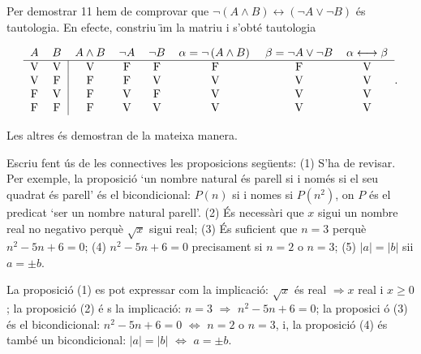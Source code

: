 Per demostrar 11 hem de comprovar que $\lnot(A\wedge B)\longleftrightarrow
\left( \lnot A\vee\lnot B\right) $ \'{e}s tautologia. En efecte, constriu%
\"{\i}m la matriu i s'obt\'{e} tautologia

\begin{equation*}
\begin{tabular}{llllllll}
$A$ & $B$ & $A\wedge B$ & $\lnot A$ & $\lnot B$ & $\alpha=\lnot\left(
A\wedge B\right) \,$ & $\beta=\lnot A\vee\lnot B$ & $\alpha%
\longleftrightarrow\beta $ \\ \hline
\multicolumn{1}{c}{V} & \multicolumn{1}{c|}{V} & \multicolumn{1}{c}{V} &
\multicolumn{1}{c}{F} & \multicolumn{1}{c}{F} & \multicolumn{1}{c}{F} &
\multicolumn{1}{c}{F} & \multicolumn{1}{c}{V} \\
\multicolumn{1}{c}{V} & \multicolumn{1}{c|}{F} & \multicolumn{1}{c}{F} &
\multicolumn{1}{c}{F} & \multicolumn{1}{c}{V} & \multicolumn{1}{c}{V} &
\multicolumn{1}{c}{V} & \multicolumn{1}{c}{V} \\
\multicolumn{1}{c}{F} & \multicolumn{1}{c|}{V} & \multicolumn{1}{c}{F} &
\multicolumn{1}{c}{V} & \multicolumn{1}{c}{F} & \multicolumn{1}{c}{V} &
\multicolumn{1}{c}{V} & \multicolumn{1}{c}{V} \\
\multicolumn{1}{c}{F} & \multicolumn{1}{c|}{F} & \multicolumn{1}{c}{F} &
\multicolumn{1}{c}{V} & \multicolumn{1}{c}{V} & \multicolumn{1}{c}{V} &
\multicolumn{1}{c}{V} & \multicolumn{1}{c}{V}%
\end{tabular}
.
\end{equation*}

Les altres \'{e}s demostran de la mateixa manera.

\begin{exemple}
Escriu fent \'{u}s de les connectives les proposicions seg\"{u}ents: (1)
S'ha de revisar. Per exemple, la proposici\'{o} `un nombre natural \'{e}s
parell si i nom\'{e}s si el seu quadrat \'{e}s parell' \'{e}s el
bicondicional: $P(n)$ si i nomes si $P(n^{2})$, on $P$ \'{e}s el predicat
`ser un nombre natural parell'. (2) \'{E}s necess\`{a}ri que $x$ sigui un
nombre real no negativo perqu\`{e} $\sqrt{x}$ sigui real; (3) \'{E}s
suficient que $n=3$ perqu\`{e} $n^{2}-5n+6=0$; (4) $n^{2}-5n+6=0$
precisament si $n=2$ o $n=3$; (5) $\left\vert a\right\vert =\left\vert
b\right\vert $ sii $a=\pm b$.
\end{exemple}

\begin{solucio}
La proposici\'{o} (1) es pot expressar com la implicaci\'{o}: $\sqrt{x}$
\'{e}s real $\Longrightarrow x$ real i $x\geq0$; la proposici\'{o} (2) \'{e}%
s la implicaci\'{o}: $n=3$ $\Longrightarrow$ $n^{2}-5n+6=0$; la proposici%
\'{o} (3) \'{e}s el bicondicional: $n^{2}-5n+6=0$ $\Longleftrightarrow$ $n=2
$ o $n=3$, i, la proposici\'{o} (4) \'{e}s tamb\'{e} un bicondicional: $%
\left\vert a\right\vert =\left\vert b\right\vert $ $\Longleftrightarrow$ $%
a=\pm b$.
\end{solucio}

